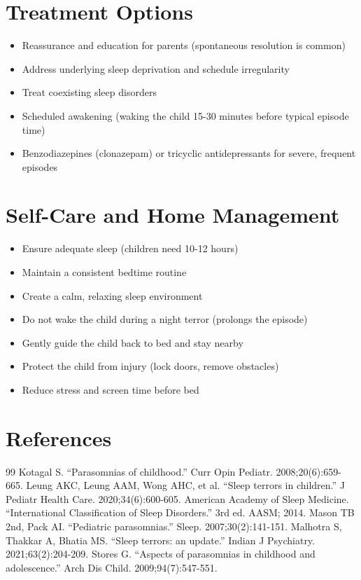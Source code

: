 \section*{Treatment Options}
\begin{itemize}
\item Reassurance and education for parents (spontaneous resolution is common)
\item Address underlying sleep deprivation and schedule irregularity
\item Treat coexisting sleep disorders
\item Scheduled awakening (waking the child 15-30 minutes before typical episode time)
\item Benzodiazepines (clonazepam) or tricyclic antidepressants for severe, frequent episodes
\end{itemize}

\section*{Self-Care and Home Management}
\begin{itemize}
\item Ensure adequate sleep (children need 10-12 hours)
\item Maintain a consistent bedtime routine
\item Create a calm, relaxing sleep environment
\item Do not wake the child during a night terror (prolongs the episode)
\item Gently guide the child back to bed and stay nearby
\item Protect the child from injury (lock doors, remove obstacles)
\item Reduce stress and screen time before bed
\end{itemize}

\section*{References}
\begin{thebibliography}{99}
 Kotagal S. ``Parasomnias of childhood.'' Curr Opin Pediatr. 2008;20(6):659-665.
 Leung AKC, Leung AAM, Wong AHC, et al. ``Sleep terrors in children.'' J Pediatr Health Care. 2020;34(6):600-605.
 American Academy of Sleep Medicine. ``International Classification of Sleep Disorders.'' 3rd ed. AASM; 2014.
 Mason TB 2nd, Pack AI. ``Pediatric parasomnias.'' Sleep. 2007;30(2):141-151.
 Malhotra S, Thakkar A, Bhatia MS. ``Sleep terrors: an update.'' Indian J Psychiatry. 2021;63(2):204-209.
 Stores G. ``Aspects of parasomnias in childhood and adolescence.'' Arch Dis Child. 2009;94(7):547-551.
\end{thebibliography}
